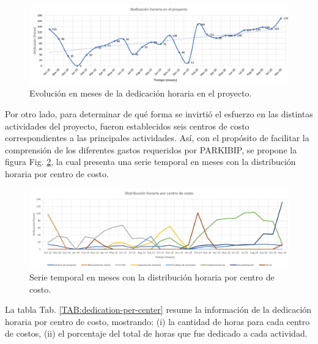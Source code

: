 \begin{figure}[h!]
\hspace*{-2.9cm}%
\includegraphics[clip,width=1.4 \columnwidth]{TESIS/imagenes/chap07/dedication-parkibip.PNG}
\caption{Evolución en meses de la dedicación horaria en el proyecto.}
\label{fig:dedication}
\end{figure}

Por otro lado, para determinar de qué forma se invirtió el esfuerzo en las distintas actividades del proyecto, fueron establecidos seis centros de costo correspondientes a las principales actividades. Así, con el propósito de facilitar la comprensión de los diferentes gastos requeridos por PARKIBIP, se propone la figura Fig. \ref{fig:dedication-costs}, la cual presenta una serie temporal en meses con la distribución horaria por centro de costo. 

\begin{figure}[h!]
\hspace*{-2.9cm}%
\includegraphics[clip,width=1.4 \columnwidth]{TESIS/imagenes/chap07/dedication-costs.PNG}
\caption{Serie temporal en meses con la distribución horaria por centro de costo.}
\label{fig:dedication-costs}
\end{figure}

La tabla Tab. \ref{TAB:dedication-per-center} resume la información de la dedicación horaria por centro de costo, mostrando: (i) la cantidad de horas para cada centro de costos, (ii) el porcentaje del total de horas que fue dedicado a cada actividad.

